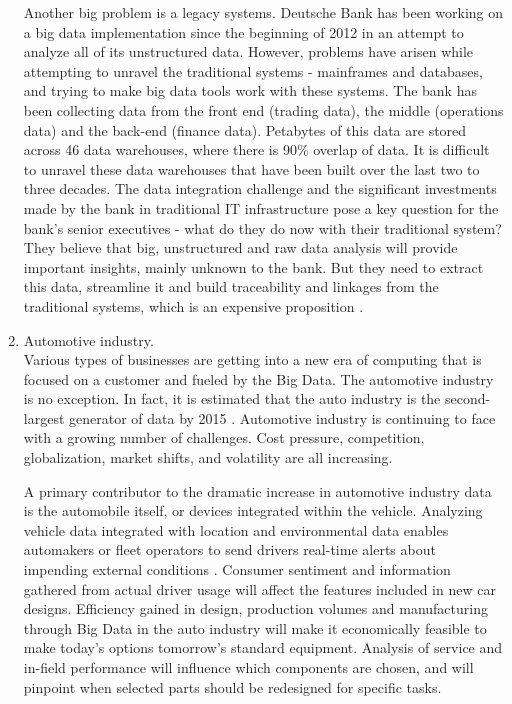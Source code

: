 \documentclass[runningheads]{llncs}
\begin{document}
\begin{enumerate}
Another big problem is a legacy systems. Deutsche Bank has been working on a big data implementation since the beginning of 2012 in an attempt to analyze all of its unstructured data. However, problems have arisen while attempting to unravel the traditional systems - mainframes and databases, and trying to make big data tools work with these systems. The bank has been collecting data from the front end (trading data), the middle (operations data) and the back-end (finance data). Petabytes of this data are stored across 46 data warehouses, where there is 90\% overlap of data. It is difficult to unravel these data warehouses that have been built over the last two to three decades. The data integration challenge and the significant investments made by the bank in traditional IT infrastructure pose a key question for the bank's senior executives - what do they do now with their traditional system? They believe that big, unstructured and raw data analysis will provide important insights, mainly unknown to the bank. But they need to extract this data, streamline it and build traceability and linkages from the traditional systems, which is an expensive proposition \cite{PREEZ}.\\

\item Automotive industry.\\

Various types of businesses are getting into a new era of computing that is focused on a customer and fueled by the Big Data. The automotive industry is no exception. In fact, it is estimated that the auto industry is the second-largest generator of data by 2015 \cite{MCKINSEY}. Automotive industry is continuing to face with a growing number of challenges. Cost pressure, competition, globalization, market shifts, and volatility are all increasing.

A primary contributor to the dramatic increase in automotive industry data is the automobile itself, or devices integrated within the vehicle. Analyzing vehicle data integrated with location and environmental data enables automakers or fleet operators to send drivers real-time alerts about impending external conditions \cite{IBMAUTOMOTIVE}. Consumer sentiment and information gathered from actual driver usage will affect the features included in new car designs. Efficiency gained in design, production volumes and manufacturing through Big Data in the auto industry will make it economically feasible to make today's options tomorrow's standard equipment. Analysis of service and in-field performance will influence which components are chosen, and will pinpoint when selected parts should be redesigned for specific tasks.

\end{enumerate}
\end{document}

